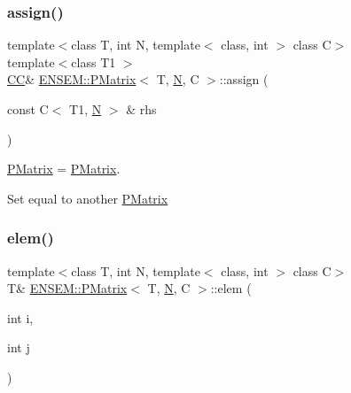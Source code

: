 \subsubsection{\texorpdfstring{assign()}{assign()}\hspace{0.1cm}{\footnotesize\ttfamily [6/6]}}
{\footnotesize\ttfamily template$<$class T, int N, template$<$ class, int $>$ class C$>$ \\
template$<$class T1 $>$ \\
\mbox{\hyperlink{classENSEM_1_1PMatrix_a744bac549029029effe32dc1705660ec}{CC}}\& \mbox{\hyperlink{classENSEM_1_1PMatrix}{E\+N\+S\+E\+M\+::\+P\+Matrix}}$<$ T, \mbox{\hyperlink{operator__name__util_8cc_a7722c8ecbb62d99aee7ce68b1752f337}{N}}, C $>$\+::assign (\begin{DoxyParamCaption}\item[{const C$<$ T1, \mbox{\hyperlink{operator__name__util_8cc_a7722c8ecbb62d99aee7ce68b1752f337}{N}} $>$ \&}]{rhs }\end{DoxyParamCaption})\hspace{0.3cm}{\ttfamily [inline]}}



\mbox{\hyperlink{classENSEM_1_1PMatrix}{P\+Matrix}} = \mbox{\hyperlink{classENSEM_1_1PMatrix}{P\+Matrix}}. 

Set equal to another \mbox{\hyperlink{classENSEM_1_1PMatrix}{P\+Matrix}} \mbox{\label{classENSEM_1_1PMatrix_a358c5f1cd954ddda32677d9ad8765ef2}} 
\subsubsection{\texorpdfstring{elem()}{elem()}\hspace{0.1cm}{\footnotesize\ttfamily [1/4]}}
{\footnotesize\ttfamily template$<$class T, int N, template$<$ class, int $>$ class C$>$ \\
T\& \mbox{\hyperlink{classENSEM_1_1PMatrix}{E\+N\+S\+E\+M\+::\+P\+Matrix}}$<$ T, \mbox{\hyperlink{operator__name__util_8cc_a7722c8ecbb62d99aee7ce68b1752f337}{N}}, C $>$\+::elem (\begin{DoxyParamCaption}\item[{int}]{i,  }\item[{int}]{j }\end{DoxyParamCaption})\hspace{0.3cm}{\ttfamily [inline]}}

